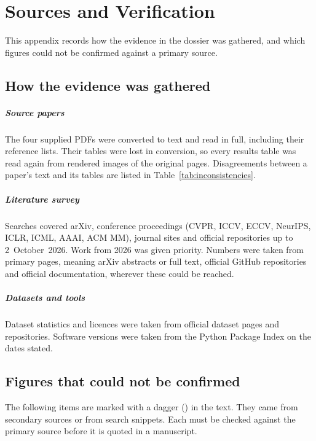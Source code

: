\chapter{Sources and Verification}
\label{app:sources}

This appendix records how the evidence in the dossier was gathered, and
which figures could not be confirmed against a primary source.

\section{How the evidence was gathered}

\paragraph{Source papers}
The four supplied PDFs were converted to text and read in full, including
their reference lists. Their tables were lost in conversion, so every
results table was read again from rendered images of the original pages.
Disagreements between a paper's text and its tables are listed in
Table~\ref{tab:inconsistencies}.

\paragraph{Literature survey}
Searches covered arXiv, conference proceedings (CVPR, ICCV, ECCV, NeurIPS,
ICLR, ICML, AAAI, ACM MM), journal sites and official repositories up to
2~October~2026. Work from 2026 was given priority. Numbers were taken from
primary pages, meaning arXiv abstracts or full text, official GitHub
repositories and official documentation, wherever these could be reached.

\paragraph{Datasets and tools}
Dataset statistics and licences were taken from official dataset pages and
repositories. Software versions were taken from the Python Package Index on
the dates stated.

\section{Figures that could not be confirmed}

The following items are marked with a dagger (\unv) in the text. They came
from secondary sources or from search snippets. Each must be checked against
the primary source before it is quoted in a manuscript.

